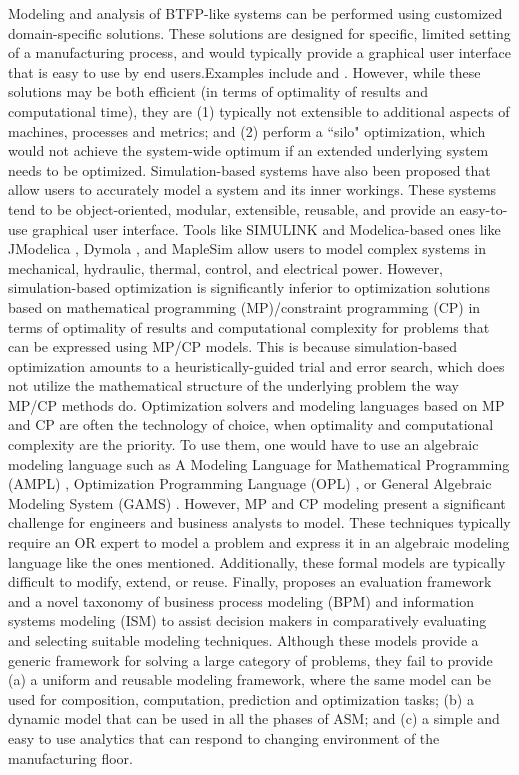 \documentclass[a4paper, 12pt]{article} %
\begin{document}
Modeling and analysis of BTFP-like systems can be performed using customized domain-specific solutions. These solutions are designed for specific, limited setting of a manufacturing process, and would typically provide a graphical user interface that is easy to use by  end users.Examples include \cite{Sharif2013} and \cite{Raska2012}. However, while these solutions may be both efficient (in terms of optimality of results and computational time), they are (1) typically not extensible to additional aspects of machines, processes and metrics; and (2) perform a ``silo" optimization, which would not achieve the system-wide optimum if an extended underlying system needs to be optimized. 
Simulation-based systems have also been proposed that allow users to accurately model a system and its inner workings. These systems tend to be object-oriented, modular, extensible, reusable, and provide an easy-to-use graphical user interface. Tools like SIMULINK \cite{Dabney:2001:MS:557989} and Modelica-based ones \cite{elmqvist1998modelica} like JModelica \cite{aakesson2009jmodelica}, Dymola \cite{bruck2002dymola}, and MapleSim \cite{hvrebivcek2008modelling} allow users to model complex systems in mechanical, hydraulic, thermal, control, and electrical power. However, simulation-based optimization is significantly inferior to optimization solutions based on mathematical programming (MP)/constraint programming (CP) in terms of optimality of results and computational complexity for problems that can be expressed using MP/CP models. This is because simulation-based optimization amounts to a heuristically-guided trial and error search, which does not utilize the mathematical structure of the underlying problem the way MP/CP methods do. Optimization solvers and modeling languages based on MP and CP are often the technology of choice, when optimality and computational complexity are the priority. To use them, one would have to use an algebraic modeling language such as A Modeling Language for Mathematical Programming (AMPL)
\cite{fourer2003ampl}, Optimization Programming Language (OPL) \cite{VanHentenryck:1999:OOP:299293}, or General Algebraic Modeling System (GAMS) \cite{boisvert1985gams}.  However, MP and CP modeling present a significant challenge for engineers and business analysts to model. These techniques typically require an OR expert to model a problem and express it in an algebraic modeling language like the ones mentioned. Additionally, these formal models are typically difficult to modify, extend, or reuse. Finally, \cite{Giaglis2001} proposes an evaluation framework and a novel taxonomy of business process modeling (BPM) and information systems modeling (ISM) to assist decision makers in comparatively evaluating and selecting suitable modeling techniques. Although these models provide a generic framework for solving a large category of problems, they fail to provide (a) a uniform and reusable modeling framework, where the same model can be used for composition, computation, prediction and optimization tasks; (b) a dynamic model that can be used in all the phases of ASM; and (c) a simple and easy to use analytics that can respond to changing environment of the manufacturing floor.
\end{document}
